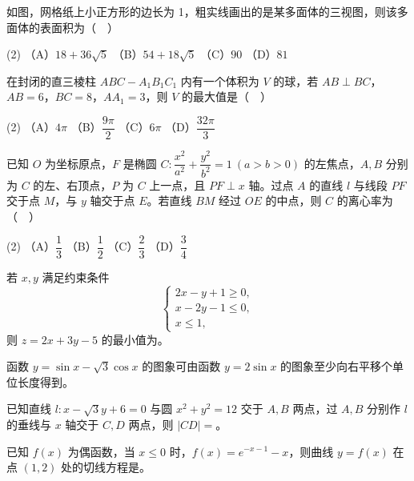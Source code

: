 \begin{question}
如图，网格纸上小正方形的边长为 1，粗实线画出的是某多面体的三视图，则该多面体的表面积为（　）
\nopagebreak[4]
\begin{center}\end{center}
\nopagebreak[4]
\begin{gkopts}(2)
\task （A）\(18+36\sqrt5\)
\task （B）\(54+18\sqrt5\)
\task （C）\(90\)
\task （D）\(81\)
\end{gkopts}

\end{question}
\begin{question}
在封闭的直三棱柱 \(ABC-A_1B_1C_1\) 内有一个体积为 \(V\) 的球，若 \(AB\perp BC\)，\(AB=6\)，\(BC=8\)，\(AA_1=3\)，则 \(V\) 的最大值是（　）

\begin{gkopts}(2)
\task （A）\(4\pi\)
\task （B）\(\dfrac{9\pi}{2}\)
\task （C）\(6\pi\)
\task （D）\(\dfrac{32\pi}{3}\)
\end{gkopts}

\end{question}
\begin{question}
已知 \(O\) 为坐标原点，\(F\) 是椭圆 \(C:\dfrac{x^2}{a^2}+\dfrac{y^2}{b^2}=1\ (a>b>0)\) 的左焦点，\(A,B\) 分别为 \(C\) 的左、右顶点，\(P\) 为 \(C\) 上一点，且 \(PF\perp x\) 轴。过点 \(A\) 的直线 \(l\) 与线段 \(PF\) 交于点 \(M\)，与 \(y\) 轴交于点 \(E\)。若直线 \(BM\) 经过 \(OE\) 的中点，则 \(C\) 的离心率为（　）

\begin{gkopts}(2)
\task （A）\(\dfrac13\)
\task （B）\(\dfrac12\)
\task （C）\(\dfrac23\)
\task （D）\(\dfrac34\)
\end{gkopts}

\end{question}

\begin{question}
若 \(x,y\) 满足约束条件
\nopagebreak[4]
\[
\begin{cases}
2x-y+1\geq0,\\
x-2y-1\leq0,\\
x\leq1,
\end{cases}
\]
则 \(z=2x+3y-5\) 的最小值为\gkblank{}。

\end{question}
\begin{question}
函数 \(y=\sin x-\sqrt3\cos x\) 的图象可由函数 \(y=2\sin x\) 的图象至少向右平移\gkblank{}个单位长度得到。

\end{question}
\begin{question}
已知直线 \(l:x-\sqrt3y+6=0\) 与圆 \(x^2+y^2=12\) 交于 \(A,B\) 两点，过 \(A,B\) 分别作 \(l\) 的垂线与 \(x\) 轴交于 \(C,D\) 两点，则 \(|CD|=\)\gkblank{}。

\end{question}
\begin{question}
已知 \(f(x)\) 为偶函数，当 \(x\leq0\) 时，\(f(x)=e^{-x-1}-x\)，则曲线 \(y=f(x)\) 在点 \((1,2)\) 处的切线方程是\gkblank{}。

\end{question}

